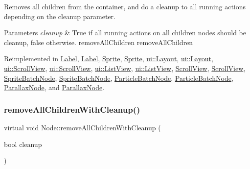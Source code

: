 Removes all children from the container, and do a cleanup to all running actions depending on the cleanup parameter.


\begin{DoxyParams}{Parameters}
{\em cleanup} & True if all running actions on all children nodes should be cleanup, false otherwise.  remove\+All\+Children  remove\+All\+Children \\
\hline
\end{DoxyParams}


Reimplemented in \hyperlink{classLabel_a5ea31447a69e1a0974aee74ad9a072e2}{Label}, \hyperlink{classLabel_a085855ab76a711d7314ae6ae6ce44c47}{Label}, \hyperlink{classSprite_aaaf5e178d5fd88574b9803fe3fab94fa}{Sprite}, \hyperlink{classSprite_a10eb2d2ae7c326487850cd1fec42382c}{Sprite}, \hyperlink{classui_1_1Layout_a7dcfdbe18bfc9e55169e957597aa19ca}{ui\+::\+Layout}, \hyperlink{classui_1_1Layout_a7c317fa2fc294158776962b9218304b9}{ui\+::\+Layout}, \hyperlink{classui_1_1ScrollView_ab72a5f9a41f99b6b8c41596bacdd116f}{ui\+::\+Scroll\+View}, \hyperlink{classui_1_1ScrollView_ac71d0fe89be6291abbccf6a6f8f011b4}{ui\+::\+Scroll\+View}, \hyperlink{classui_1_1ListView_a04bcc9bd8c55dea8f034a8380b3ab3a8}{ui\+::\+List\+View}, \hyperlink{classui_1_1ListView_a01691c095058bc86f372e6439b15b151}{ui\+::\+List\+View}, \hyperlink{classScrollView_a8b2cfd556bae69ffbd5ae3d5813d53e5}{Scroll\+View}, \hyperlink{classScrollView_ac71d0fe89be6291abbccf6a6f8f011b4}{Scroll\+View}, \hyperlink{classSpriteBatchNode_aef759fbb4337b71813e05bf91a0daae8}{Sprite\+Batch\+Node}, \hyperlink{classSpriteBatchNode_a1b49c2764f43641c912c66c2d58b85a0}{Sprite\+Batch\+Node}, \hyperlink{classParticleBatchNode_ac4875ff56dadd5f836d9b99a36201bb1}{Particle\+Batch\+Node}, \hyperlink{classParticleBatchNode_ac4875ff56dadd5f836d9b99a36201bb1}{Particle\+Batch\+Node}, \hyperlink{classParallaxNode_acff596a0ad508105213baddf02cb05e8}{Parallax\+Node}, and \hyperlink{classParallaxNode_aa3b4fa198c648421759a8500d2e8d97a}{Parallax\+Node}.

\mbox{\label{classNode_a0e179356e2ffbff60f02149b35edacc1}} 
\subsubsection{\texorpdfstring{remove\+All\+Children\+With\+Cleanup()}{removeAllChildrenWithCleanup()}\hspace{0.1cm}{\footnotesize\ttfamily [2/2]}}
{\footnotesize\ttfamily virtual void Node\+::remove\+All\+Children\+With\+Cleanup (\begin{DoxyParamCaption}\item[{bool}]{cleanup }\end{DoxyParamCaption})\hspace{0.3cm}{\ttfamily [virtual]}}


